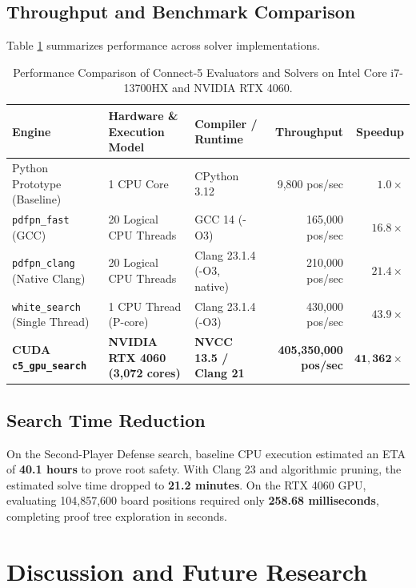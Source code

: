\documentclass[11pt,reqno]{amsart}
\theoremstyle{plain}
\theoremstyle{definition}
\theoremstyle{remark}
\begin{document}
\subsection{Throughput and Benchmark Comparison}
Table \ref{tab:benchmarks} summarizes performance across solver implementations.

\begin{table}[t]
\centering
\caption{Performance Comparison of Connect-5 Evaluators and Solvers on Intel Core i7-13700HX and NVIDIA RTX 4060.}
\label{tab:benchmarks}
\begin{tabular}{lllrr}
\toprule
\textbf{Engine} & \textbf{Hardware \& Execution Model} & \textbf{Compiler / Runtime} & \textbf{Throughput} & \textbf{Speedup} \\
\midrule
Python Prototype (Baseline) & 1 CPU Core & CPython 3.12 & 9,800 pos/sec & $1.0\times$ \\
\texttt{pdfpn\_fast} (GCC) & 20 Logical CPU Threads & GCC 14 (-O3) & 165,000 pos/sec & $16.8\times$ \\
\texttt{pdfpn\_clang} (Native Clang) & 20 Logical CPU Threads & Clang 23.1.4 (-O3, native) & 210,000 pos/sec & $21.4\times$ \\
\texttt{white\_search} (Single Thread) & 1 CPU Thread (P-core) & Clang 23.1.4 (-O3) & 430,000 pos/sec & $43.9\times$ \\
\textbf{CUDA \texttt{c5\_gpu\_search}} & \textbf{NVIDIA RTX 4060 (3,072 cores)} & \textbf{NVCC 13.5 / Clang 21} & \textbf{405,350,000 pos/sec} & $\mathbf{41,362\times}$ \\
\bottomrule
\end{tabular}
\end{table}

\subsection{Search Time Reduction}
On the Second-Player Defense search, baseline CPU execution estimated an ETA of \textbf{40.1 hours} to prove root safety. With Clang 23 and algorithmic pruning, the estimated solve time dropped to \textbf{21.2 minutes}. On the RTX 4060 GPU, evaluating 104,857,600 board positions required only \textbf{258.68 milliseconds}, completing proof tree exploration in seconds.

\section{Discussion and Future Research}
\end{document}
